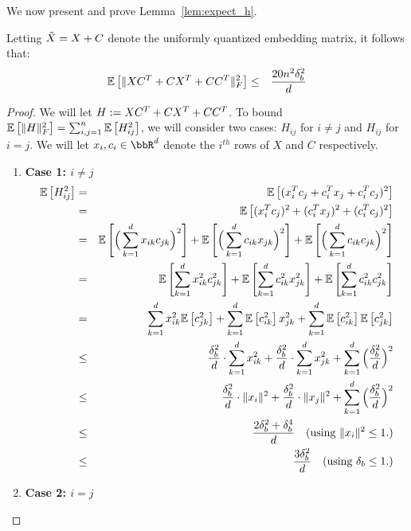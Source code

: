 We now present and prove Lemma~\ref{lem:expect_h}.

\begin{lemma}
Letting $\tX = X+C$ denote the uniformly quantized embedding matrix, it follows that:
\begin{eqnarray}
\expect{}{\|XC^T + CX^T + CC^T\|_F^2} &\leq& \frac{20n^2\delta_b^2}{d}
\end{eqnarray}
\label{lem:expect_h}
\end{lemma}
\begin{proof}
We will let $H \defeq XC^T + CX^T + CC^T$.
To bound $\expect{}{\|H\|_F^2} = \sum_{i,j=1}^n \expect{}{H_{ij}^2}$, we will consider two cases: $H_{ij}$ for $i\neq j$ and $H_{ij}$ for $i=j$.
We will let $x_i, c_i \in \RR^d$ denote the $i^{th}$ rows of $X$ and $C$ respectively.\\
\begin{enumerate}
\item \textbf{Case 1: $i\neq j$}\\
\begin{eqnarray*}
	\expect{}{H_{ij}^2} &=& \expect{}{(x_i^T c_j + c_i^T x_j + c_i^T c_j)^2} \\
	&=& \expect{}{(x_i^T c_j)^2 + (c_i^T x_j)^2 + (c_i^T c_j)^2} \\
	&=& \expect{}{\Big(\sum_{k=1}^d x_{ik} c_{jk}\Big)^2} + \expect{}{\Big(\sum_{k=1}^d c_{ik} x_{jk}\Big)^2} + \expect{}{\Big(\sum_{k=1}^d c_{ik} c_{jk}\Big)^2} \\
	&=& \expect{}{\sum_{k=1}^d x_{ik}^2 c_{jk}^2} + \expect{}{\sum_{k=1}^d c_{ik}^2 x_{jk}^2} + \expect{}{\sum_{k=1}^d c_{ik}^2 c_{jk}^2}\\
	&=& \sum_{k=1}^d x_{ik}^2 \expect{}{c_{jk}^2} + \sum_{k=1}^d \expect{}{c_{ik}^2} x_{jk}^2 + \sum_{k=1}^d \expect{}{c_{ik}^2} \expect{}{c_{jk}^2}\\
	&\leq& \frac{\delta_b^2}{d}\cdot \sum_{k=1}^d x_{ik}^2 + \frac{\delta_b^2}{d}\cdot \sum_{k=1}^d x_{jk}^2 + \sum_{k=1}^d \Big(\frac{\delta_b^2}{d}\Big)^2 \\
	&\leq& \frac{\delta_b^2}{d}\cdot \|x_i\|^2 + \frac{\delta_b^2}{d}\cdot \|x_j\|^2 + \sum_{k=1}^d \Big(\frac{\delta_b^2}{d}\Big)^2 \\
	&\leq& \frac{2\delta_b^2 + \delta_b^4}{d} \quad \text{(using $\|x_i\|^2 \leq 1$.)} \\
	&\leq& \frac{3\delta_b^2}{d} \quad \text{(using $\delta_b \leq 1$.)} \\
\end{eqnarray*}
\item \textbf{Case 2: $i = j$}\\

\end{enumerate}
\end{proof}
